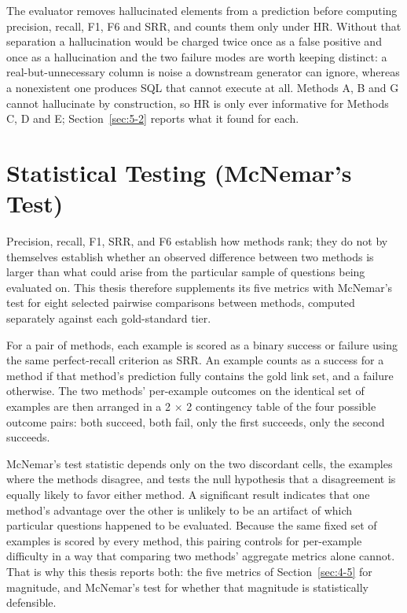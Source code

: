 The evaluator removes hallucinated elements from a prediction before computing precision, recall, F1, F6 and SRR, and counts them only under HR. Without that separation a hallucination would be charged twice once as a false positive and once as a hallucination and the two failure modes are worth keeping distinct: a real-but-unnecessary column is noise a downstream generator can ignore, whereas a nonexistent one produces SQL that cannot execute at all. Methods A, B and G cannot hallucinate by construction, so HR is only ever informative for Methods C, D and E; Section~\ref{sec:5-2} reports what it found for each.

\section{Statistical Testing (McNemar's Test)}\label{sec:4-6}

Precision, recall, F1, SRR, and F6 establish how methods rank; they do not by themselves establish whether an observed difference between two methods is larger than what could arise from the particular sample of questions being evaluated on. This thesis therefore supplements its five metrics with McNemar's test \citep{mcnemar1947} for eight selected pairwise comparisons between methods, computed separately against each gold-standard tier.

For a pair of methods, each example is scored as a binary success or failure using the same perfect-recall criterion as SRR. An example counts as a success for a method if that method's prediction fully contains the gold link set, and a failure otherwise. The two methods' per-example outcomes on the identical set of examples are then arranged in a 2 \ensuremath{\times} 2 contingency table of the four possible outcome pairs: both succeed, both fail, only the first succeeds, only the second succeeds.

McNemar's test statistic depends only on the two discordant cells, the examples where the methods disagree, and tests the null hypothesis that a disagreement is equally likely to favor either method. A significant result indicates that one method's advantage over the other is unlikely to be an artifact of which particular questions happened to be evaluated. Because the same fixed set of examples is scored by every method, this pairing controls for per-example difficulty in a way that comparing two methods' aggregate metrics alone cannot. That is why this thesis reports both: the five metrics of Section~\ref{sec:4-5} for magnitude, and McNemar's test for whether that magnitude is statistically defensible.
